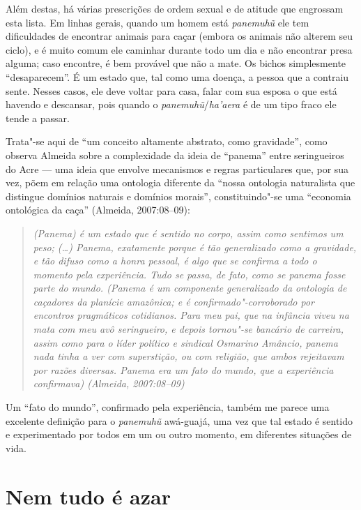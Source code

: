 Além destas, há várias prescrições de ordem sexual e de atitude que
engrossam esta lista. Em linhas gerais, quando um homem está
\emph{panemuhũ} ele tem dificuldades de encontrar animais para caçar
(embora os animais não alterem seu ciclo), e é muito comum ele caminhar
durante todo um dia e não encontrar presa alguma; caso encontre, é bem
provável que não a mate. Os bichos simplesmente ``desaparecem''. É um
estado que, tal como uma doença, a pessoa que a contraiu sente. Nesses
casos, ele deve voltar para casa, falar com sua esposa o que está
havendo e descansar, pois quando o \emph{panemuhũ}/\emph{ha'aera} é de
um tipo fraco ele tende a passar.

Trata"-se aqui de ``um conceito altamente abstrato, como gravidade'',
como observa Almeida sobre a complexidade da ideia de ``panema'' entre
seringueiros do Acre --- uma ideia que envolve mecanismos e regras
particulares que, por sua vez, põem em relação uma ontologia diferente
da ``nossa ontologia naturalista que distingue domínios naturais e
domínios morais'', constituindo"-se uma ``economia ontológica da caça''
(Almeida, 2007:08--09):

\begin{quote}
\emph{(Panema) é um estado que é sentido no corpo, assim como sentimos um
peso; (\ldots{}) Panema, exatamente porque é tão generalizado como a
gravidade, e tão difuso como a honra pessoal, é algo que se confirma a
todo o momento pela experiência. Tudo se passa, de fato, como se panema
fosse parte do mundo. (Panema é um componente generalizado da
ontologia de caçadores da planície amazônica; e é confirmado"-corroborado
por encontros pragmáticos cotidianos. Para meu pai, que na infância
viveu na mata com meu avô seringueiro, e depois tornou"-se bancário de
carreira, assim como para o líder político e sindical Osmarino Amâncio,
panema nada tinha a ver com superstição, ou com religião, que ambos
rejeitavam por razões diversas. Panema era um fato do mundo, que a
experiência confirmava) (Almeida, 2007:08--09)}
\end{quote}

Um ``fato do mundo'', confirmado pela experiência, também me parece uma
excelente definição para o \emph{panemuhũ} awá-guajá, uma vez que tal
estado é sentido e experimentado por todos em um ou outro momento, em
diferentes situações de vida.

\section{Nem tudo é azar}

